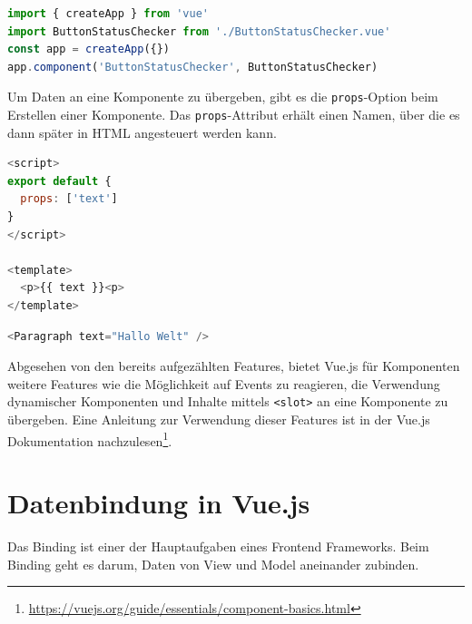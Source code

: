 
\begin{lstlisting}[caption={Globale Registrierung einer Komponente},language=javascript,label={lst:Globale Registrierung}]
import { createApp } from 'vue'
import ButtonStatusChecker from './ButtonStatusChecker.vue'
const app = createApp({})
app.component('ButtonStatusChecker', ButtonStatusChecker)
\end{lstlisting}


Um Daten an eine Komponente zu übergeben, gibt es die \texttt{props}-Option beim Erstellen einer Komponente.
Das \texttt{props}-Attribut erhält einen Namen, über die es dann später in
HTML angesteuert werden kann. \cite{vueComponents}

\newpage

\begin{lstlisting}[caption={Erstellung eines \texttt{props}},language=javascript,label={lst:Erstellung eines props}]
<script>
export default {
  props: ['text']
}
</script>

<template>
  <p>{{ text }}<p>
</template>
\end{lstlisting}

\begin{lstlisting}[caption={Nutzung eines \texttt{props}},language=javascript,label={lst:Nutzung eines props}]
<Paragraph text="Hallo Welt" />
\end{lstlisting}

Abgesehen von den bereits aufgezählten Features, bietet Vue.js für Komponenten weitere Features wie die Möglichkeit auf Events zu reagieren,
die Verwendung dynamischer Komponenten und Inhalte mittels \texttt{<slot>} an eine Komponente zu übergeben.
Eine Anleitung zur Verwendung dieser Features ist in der Vue.js Dokumentation nachzulesen\footnote{\url{https://vuejs.org/guide/essentials/component-basics.html}}.
\cite{vueComponents}



\section{Datenbindung in Vue.js}\label{sec:datenbindung-in-vue.js}
Das Binding ist einer der Hauptaufgaben eines Frontend Frameworks.
Beim Binding geht es darum, Daten von View und Model aneinander zubinden. \cite[S. 11]{steyer2019}
